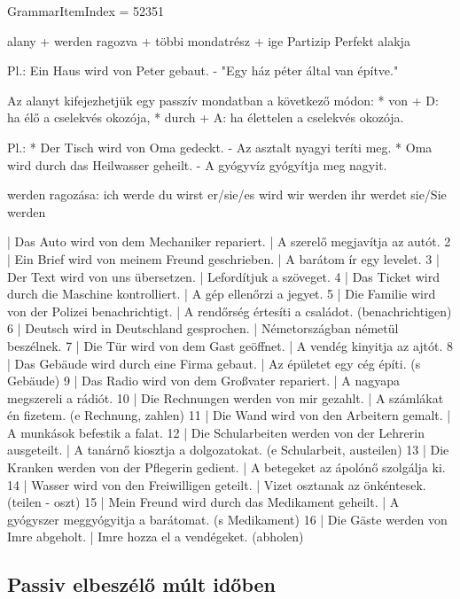 \documentclass{article}
\newenvironment{desc}{\verbatim}{\endverbatim}
\newenvironment{exmp}{\verbatim}{\endverbatim}
\begin{document}
GrammarItemIndex = 52351

\begin{desc}
alany + werden ragozva + többi mondatrész + ige Partizip Perfekt alakja

Pl.: Ein Haus wird von Peter gebaut. - "Egy ház péter által van építve."

Az alanyt kifejezhetjük egy passzív mondatban a következő módon:
* von + D: ha élő a cselekvés okozója,
* durch + A: ha élettelen a cselekvés okozója.

Pl.: * Der Tisch wird von Oma gedeckt. - Az asztalt nyagyi teríti meg.
* Oma wird durch das Heilwasser geheilt. - A gyógyvíz gyógyítja meg nagyit.

werden ragozása:
ich werde
du wirst
er/sie/es wird
wir werden
ihr werdet
sie/Sie werden
\end{desc}

\begin{exmp}
1 | Das Auto wird von dem Mechaniker repariert. | A szerelő megjavítja az autót.
2 | Ein Brief wird von meinem Freund geschrieben. | A barátom ír egy levelet.
3 | Der Text wird von uns übersetzen. | Lefordítjuk a szöveget.
4 | Das Ticket wird durch die Maschine kontrolliert. | A gép ellenőrzi a jegyet.
5 | Die Familie wird von der Polizei benachrichtigt. | A rendőrség értesíti a családot. (benachrichtigen)
6 | Deutsch wird in Deutschland gesprochen. | Németországban németül beszélnek.
7 | Die Tür wird von dem Gast geöffnet. | A vendég kinyitja az ajtót.
8 | Das Gebäude wird durch eine Firma gebaut. | Az épületet egy cég építi. (s Gebäude)
9 | Das Radio wird von dem Großvater repariert. | A nagyapa megszereli a rádiót.
10 | Die Rechnungen werden von mir gezahlt. | A számlákat én fizetem. (e Rechnung, zahlen)
11 | Die Wand wird von den Arbeitern gemalt. | A munkások befestik a falat.
12 | Die Schularbeiten werden von der Lehrerin ausgeteilt. | A tanárnő kiosztja a dolgozatokat. (e Schularbeit, austeilen)
13 | Die Kranken werden von der Pflegerin gedient. | A betegeket az ápolónő szolgálja ki.
14 | Wasser wird von den Freiwilligen geteilt. | Vizet osztanak az önkéntesek. (teilen - oszt)
15 | Mein Freund wird durch das Medikament geheilt. | A gyógyszer meggyógyitja a barátomat. (s Medikament)
16 | Die Gäste werden von Imre abgeholt. | Imre hozza el a vendégeket. (abholen)
\end{exmp}

\subsection{Passiv elbeszélő múlt időben}
\end{document}
